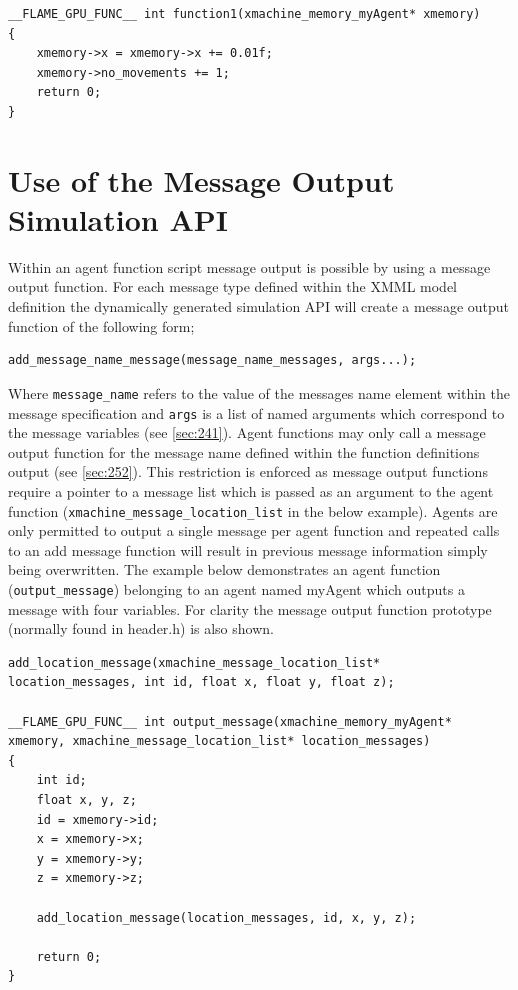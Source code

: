 \documentclass[11pt, a4paper, onecolumn, oneside]{report}
\begin{document}
\begin{lstlisting}[language=C_]
__FLAME_GPU_FUNC__ int function1(xmachine_memory_myAgent* xmemory)
{
    xmemory->x = xmemory->x += 0.01f;
    xmemory->no_movements += 1;
    return 0;
}
\end{lstlisting}

\section{Use of the Message Output Simulation API}
\label{sec:34}


Within an agent function script message output is possible by using a message output function.
For each message type defined within the XMML model definition the dynamically generated simulation API will create a message output function of the following form; 


\begin{verbatim}
add_message_name_message(message_name_messages, args...);
\end{verbatim}

Where \texttt{message_name} refers to the value of the messages name element within the message specification and \texttt{args} is a list of named arguments which correspond to the message variables (see \cref{sec:241}).
Agent functions may only call a message output function for the message name defined within the function definitions output (see \cref{sec:252}).
This restriction is enforced as message output functions require a pointer to a message list which is passed as an argument to the agent function (\texttt{xmachine_message_location_list} in the below example).
Agents are only permitted to output a single message per agent function and repeated calls to an add message function will result in previous message information simply being overwritten.
The example below demonstrates an agent function (\texttt{output_message}) belonging to an agent named myAgent which outputs a message with four variables.
For clarity the message output function prototype (normally found in header.h) is also shown.

\begin{lstlisting}[language=C_]
add_location_message(xmachine_message_location_list* location_messages, int id, float x, float y, float z);

__FLAME_GPU_FUNC__ int output_message(xmachine_memory_myAgent* xmemory, xmachine_message_location_list* location_messages)
{
    int id;
    float x, y, z;
    id = xmemory->id;
    x = xmemory->x;
    y = xmemory->y;
    z = xmemory->z;

    add_location_message(location_messages, id, x, y, z);

    return 0;
}
\end{lstlisting}
\end{document}
